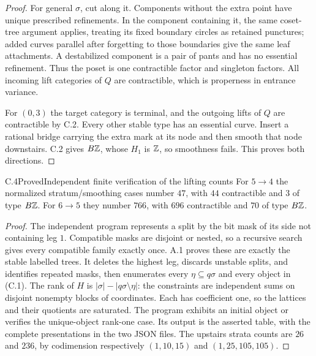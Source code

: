 \begin{proof}
For general $\sigma$, cut along it. Components without the extra point have unique prescribed refinements. In the component containing it, the same coset-tree argument applies, treating its fixed boundary circles as retained punctures; added curves parallel after forgetting to those boundaries give the same leaf attachments. A destabilized component is a pair of pants and has no essential refinement. Thus the poset is one contractible factor and singleton factors. All incoming lift categories of $Q$ are contractible, which is properness in entrance variance.

For $(0,3)$ the target category is terminal, and the outgoing lifts of $Q$ are contractible by C.2. Every other stable type has an essential curve. Insert a rational bridge carrying the extra mark at its node and then smooth that node downstairs. C.2 gives $B\mathbb Z$, whose $H_1$ is $\mathbb Z$, so smoothness fails. This proves both directions.
\end{proof}

\begin{result}{C.4}{Proved}{Independent finite verification of the lifting counts}
For $5\to4$ the normalized stratum/smoothing cases number $47$, with $44$ contractible and $3$ of type $B\mathbb Z$. For $6\to5$ they number $766$, with $696$ contractible and $70$ of type $B\mathbb Z$.
\end{result}
\begin{proof}
The independent program  represents a split by the bit mask of its side not containing leg $1$. Compatible masks are disjoint or nested, so a recursive search gives every compatible family exactly once. A.1 proves these are exactly the stable labelled trees. It deletes the highest leg, discards unstable splits, and identifies repeated masks, then enumerates every $\eta\subseteq q\sigma$ and every object in (C.1). The rank of $H$ is $|\sigma|-|q\sigma\setminus\eta|$: the constraints are independent sums on disjoint nonempty blocks of coordinates. Each has coefficient one, so the lattices and their quotients are saturated. The program exhibits an initial object or verifies the unique-object rank-one case. Its output is the asserted table, with the complete presentations in the two JSON files. The upstairs strata counts are $26$ and $236$, by codimension respectively $(1,10,15)$ and $(1,25,105,105)$.
\end{proof}

